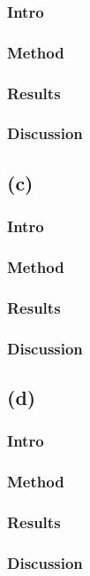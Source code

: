 \documentclass[11pt,a4paper,notitlepage]{article}
\begin{document}
\subsubsection{Intro}
\subsubsection{Method}
\subsubsection{Results}
\subsubsection{Discussion}

\subsection{(c)}
\subsubsection{Intro}
\subsubsection{Method}
\subsubsection{Results}
\subsubsection{Discussion}

\subsection{(d)}
\subsubsection{Intro}
\subsubsection{Method}
\subsubsection{Results}
\subsubsection{Discussion}
\end{document}

